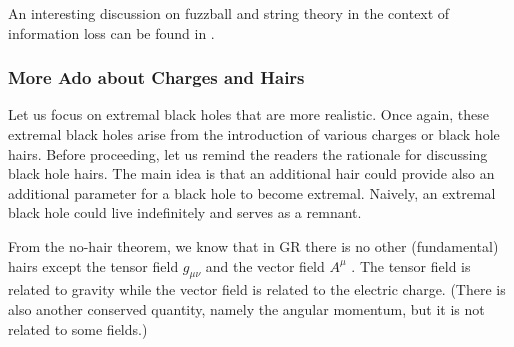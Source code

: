\documentclass[12pt]{article}
\newcommand{\2}{$^2$}
\newcommand{\3}{$^3$}
\newcommand{\4}{$_4$}
\newcommand{\5}{$_5$}
\begin{document}
An interesting discussion on fuzzball and string theory in the context of information loss can be found in \cite{bena}.

\subsubsection{More Ado about Charges and Hairs}

Let us focus on extremal black holes that are more realistic. Once again, these extremal black holes arise from the introduction of various charges or black hole hairs. 
Before proceeding, let us remind the readers the rationale for discussing black hole hairs. The main idea is that an additional hair could provide also an additional parameter for a black hole to become extremal. Naively, an extremal black hole could live indefinitely and serves as a remnant.  

From the no-hair theorem, we know that in GR there is no other (fundamental) hairs except the tensor field $g_{\mu\nu}$ and the vector field $A^{\mu}$ \cite{Teitelboim:1972qx}. The tensor field is related to gravity while the vector field is related to the electric charge. (There is also another conserved quantity, namely the angular momentum, but it is not related to some fields.)
\end{document}
